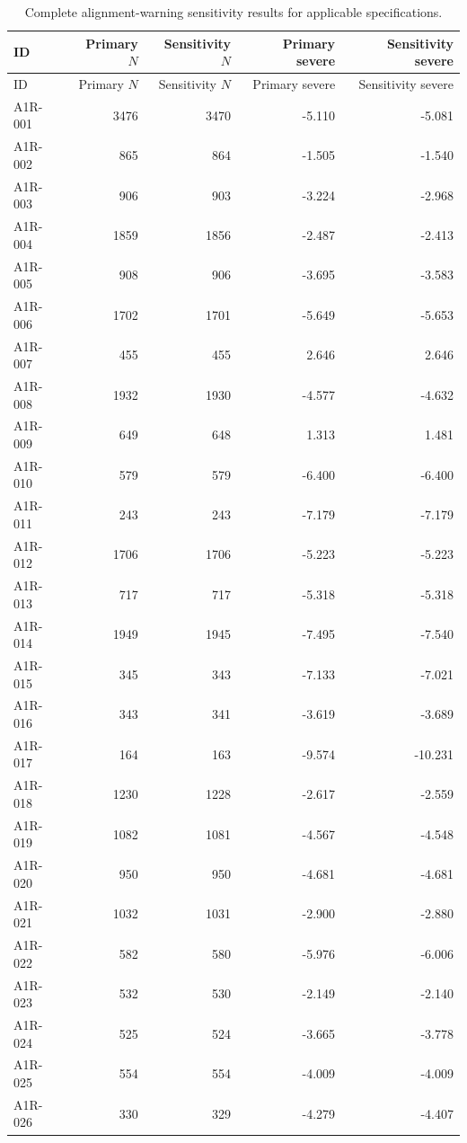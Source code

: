 \begingroup\scriptsize\setlength{\tabcolsep}{3pt}
\begin{longtable}{lrrrr}
\caption{Complete alignment-warning sensitivity results for applicable specifications.}\label{tab:s_alignment}\\
\toprule ID & Primary $N$ & Sensitivity $N$ & Primary severe & Sensitivity severe \\
\midrule\endfirsthead
\toprule ID & Primary $N$ & Sensitivity $N$ & Primary severe & Sensitivity severe \\
\midrule\endhead
A1R-001 & 3476 & 3470 & -5.110 & -5.081 \\
A1R-002 & 865 & 864 & -1.505 & -1.540 \\
A1R-003 & 906 & 903 & -3.224 & -2.968 \\
A1R-004 & 1859 & 1856 & -2.487 & -2.413 \\
A1R-005 & 908 & 906 & -3.695 & -3.583 \\
A1R-006 & 1702 & 1701 & -5.649 & -5.653 \\
A1R-007 & 455 & 455 & 2.646 & 2.646 \\
A1R-008 & 1932 & 1930 & -4.577 & -4.632 \\
A1R-009 & 649 & 648 & 1.313 & 1.481 \\
A1R-010 & 579 & 579 & -6.400 & -6.400 \\
A1R-011 & 243 & 243 & -7.179 & -7.179 \\
A1R-012 & 1706 & 1706 & -5.223 & -5.223 \\
A1R-013 & 717 & 717 & -5.318 & -5.318 \\
A1R-014 & 1949 & 1945 & -7.495 & -7.540 \\
A1R-015 & 345 & 343 & -7.133 & -7.021 \\
A1R-016 & 343 & 341 & -3.619 & -3.689 \\
A1R-017 & 164 & 163 & -9.574 & -10.231 \\
A1R-018 & 1230 & 1228 & -2.617 & -2.559 \\
A1R-019 & 1082 & 1081 & -4.567 & -4.548 \\
A1R-020 & 950 & 950 & -4.681 & -4.681 \\
A1R-021 & 1032 & 1031 & -2.900 & -2.880 \\
A1R-022 & 582 & 580 & -5.976 & -6.006 \\
A1R-023 & 532 & 530 & -2.149 & -2.140 \\
A1R-024 & 525 & 524 & -3.665 & -3.778 \\
A1R-025 & 554 & 554 & -4.009 & -4.009 \\
A1R-026 & 330 & 329 & -4.279 & -4.407 \\

\end{longtable}
